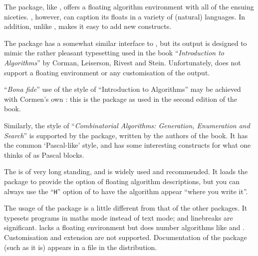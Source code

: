 The  package, like , offers a
floating algorithm environment with all of the ensuing niceties.
, however, can caption its floats in a variety of
(natural) languages.  In addition,  unlike
, makes it easy to add new constructs.

The  package has a somewhat similar interface to
, but its output is designed to mimic the rather
pleasant typesetting used in the book ``\emph{Introduction to Algorithms}''
by Corman, Leiserson, Rivest and Stein. Unfortunately,
 does not support a floating environment or any
customisation of the output.

``\emph{Bona fide}'' use of the style of ``Introduction to
Algorithms'' may be achieved with Cormen's own :
this is the package as used in the second edition of the book.

Similarly, the style of %
``\emph{Combinatorial Algorithms: Generation, Enumeration and Search}''
is supported by the  package, written by the
authors of the book.  It has the common `Pascal-like' style, and has
some interesting constructs for what one thinks of as Pascal blocks.

The  is of very long standing, and is widely used
and recommended.  It loads the  package to provide the
option of floating algorithm descriptions, but you can always use the
``\texttt{H}'' option of  to have the algorithm appear
``where you write it''.

The usage of the  package is a little different from
that of the other packages.  It typesets programs in maths mode
instead of text mode; and linebreaks are significant.
 lacks a floating environment but does number
algorithms like  and .  Customisation
and extension are not supported.  Documentation of the
 package (such as it is) appears in a file
 in the distribution.

